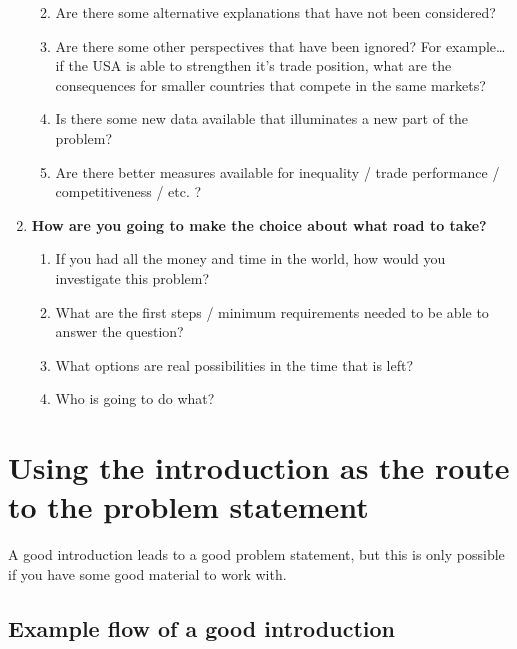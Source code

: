 \documentclass[
]{book}
\begin{document}
\begin{enumerate}
  \begin{enumerate}
  \def\labelenumii{\arabic{enumii}.}
  \item
    Are there some alternative explanations that have not been considered?
  \item
    Are there some other perspectives that have been ignored? For example\ldots{} if the USA is able to strengthen it's trade position, what are the consequences for smaller countries that compete in the same markets?
  \item
    Is there some new data available that illuminates a new part of the problem?
  \item
    Are there better measures available for inequality / trade performance / competitiveness / etc. ?
  \end{enumerate}
\item
  \textbf{How are you going to make the choice about what road to take?}

  \begin{enumerate}
  \def\labelenumii{\arabic{enumii}.}
  \item
    If you had all the money and time in the world, how would you investigate this problem?
  \item
    What are the first steps / minimum requirements needed to be able to answer the question?
  \item
    What options are real possibilities in the time that is left?
  \item
    Who is going to do what?
  \end{enumerate}
\end{enumerate}

\hypertarget{using-the-introduction-as-the-route-to-the-problem-statement}{%
\section{Using the introduction as the route to the problem statement}\label{using-the-introduction-as-the-route-to-the-problem-statement}}

A good introduction leads to a good problem statement, but this is only
possible if you have some good material to work with.

\hypertarget{example-flow-of-a-good-introduction}{%
\subsection{Example flow of a good introduction}\label{example-flow-of-a-good-introduction}}
\end{document}

